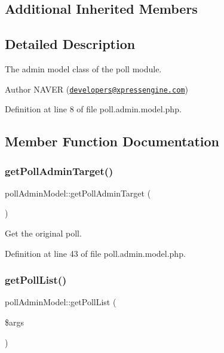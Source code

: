 \subsection*{Additional Inherited Members}


\subsection{Detailed Description}
The admin model class of the poll module. 

\begin{DoxyAuthor}{Author}
N\+A\+V\+ER (\href{mailto:developers@xpressengine.com}{\tt developers@xpressengine.\+com}) 
\end{DoxyAuthor}


Definition at line 8 of file poll.\+admin.\+model.\+php.



\subsection{Member Function Documentation}
\hypertarget{classpollAdminModel_ab66a2c6d66e9bebfabf443255c78e401}{}\label{classpollAdminModel_ab66a2c6d66e9bebfabf443255c78e401} 
\subsubsection{\texorpdfstring{get\+Poll\+Admin\+Target()}{getPollAdminTarget()}}
{\footnotesize\ttfamily poll\+Admin\+Model\+::get\+Poll\+Admin\+Target (\begin{DoxyParamCaption}{ }\end{DoxyParamCaption})}



Get the original poll. 



Definition at line 43 of file poll.\+admin.\+model.\+php.

\hypertarget{classpollAdminModel_a96ab22244c98bf1b777265f0027aca6e}{}\label{classpollAdminModel_a96ab22244c98bf1b777265f0027aca6e} 
\subsubsection{\texorpdfstring{get\+Poll\+List()}{getPollList()}}
{\footnotesize\ttfamily poll\+Admin\+Model\+::get\+Poll\+List (\begin{DoxyParamCaption}\item[{}]{\$args }\end{DoxyParamCaption})}



